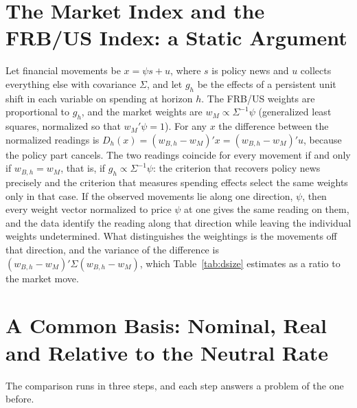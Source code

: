 \documentclass[11pt]{article}
\begin{document}
\FloatBarrier
\newpage
\begin{appendices}
\renewcommand{\thetable}{\Alph{section}\arabic{table}}
\renewcommand{\thefigure}{\Alph{section}\arabic{figure}}
\FloatBarrier



\section{The Market Index and the FRB/US Index: a Static Argument}\label{app:ma}
Let financial movements be $x=\psi s+u$, where $s$ is policy news and $u$ collects everything else with covariance $\Sigma$, and let $g_h$ be the effects of a persistent unit shift in each variable on spending at horizon $h$. The FRB/US weights are proportional to $g_h$, and the market weights are $w_M\propto\Sigma^{-1}\psi$ (generalized least squares, normalized so that $w_M'\psi=1$). For any $x$ the difference between the normalized readings is $D_h(x)=(w_{B,h}-w_M)'x=(w_{B,h}-w_M)'u$, because the policy part cancels. The two readings coincide for every movement if and only if $w_{B,h}=w_M$, that is, if $g_h\propto\Sigma^{-1}\psi$: the criterion that recovers policy news precisely and the criterion that measures spending effects select the same weights only in that case. If the observed movements lie along one direction, $\psi$, then every weight vector normalized to price $\psi$ at one gives the same reading on them, and the data identify the reading along that direction while leaving the individual weights undetermined. What distinguishes the weightings is the movements off that direction, and the variance of the difference is $(w_{B,h}-w_M)'\Sigma(w_{B,h}-w_M)$, which Table~\ref{tab:dsize} estimates as a ratio to the market move.

\section{A Common Basis: Nominal, Real and Relative to the Neutral Rate}\label{sec:steps}\label{app:steps}
The comparison runs in three steps, and each step answers a problem of the one before.


\end{appendices}
\end{document}
